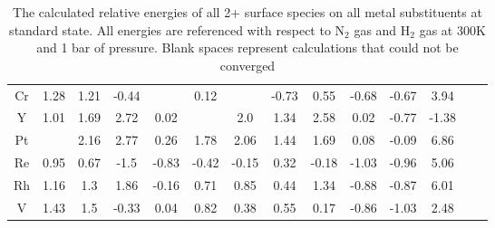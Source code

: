 \begin{table}
\begin{center}
\begin{tabular}{| c | c | c | c | c | c | c | c | c | c | c | c | c | c |}
Cr & 1.28 & 1.21 & -0.44 &  & 0.12 &  & -0.73 & 0.55 & -0.68 & -0.67 & 3.94 \\
Y & 1.01 & 1.69 & 2.72 & 0.02 &  & 2.0 & 1.34 & 2.58 & 0.02 & -0.77 & -1.38 \\
Pt &  & 2.16 & 2.77 & 0.26 & 1.78 & 2.06 & 1.44 & 1.69 & 0.08 & -0.09 & 6.86 \\
Re & 0.95 & 0.67 & -1.5 & -0.83 & -0.42 & -0.15 & 0.32 & -0.18 & -1.03 & -0.96 & 5.06 \\
Rh & 1.16 & 1.3 & 1.86 & -0.16 & 0.71 & 0.85 & 0.44 & 1.34 & -0.88 & -0.87 & 6.01 \\
V & 1.43 & 1.5 & -0.33 & 0.04 & 0.82 & 0.38 & 0.55 & 0.17 & -0.86 & -1.03 & 2.48 \\
\hline
\end{tabular}
\end{center}
\caption{The calculated relative energies of all 2+ surface species on all metal substituents at standard state. All energies are referenced with respect to N$_2$ gas and H$_2$ gas at 300K and 1 bar of pressure. Blank spaces represent calculations that could not be converged}
\label{table:energies}
\end{table}

